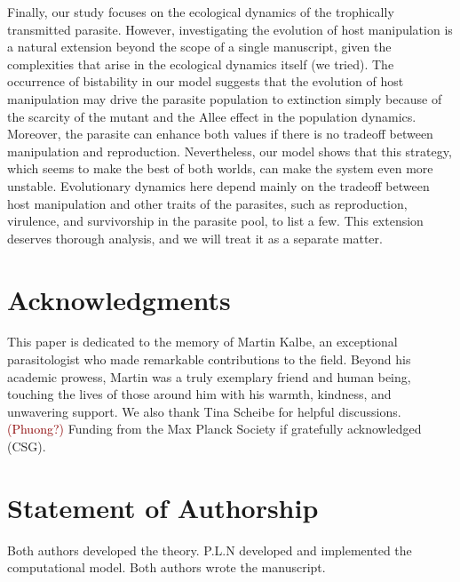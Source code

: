 \documentclass[11pt]{article}
\newcommand{\cha}[1]{\textcolor{darkred}{(#1)}}
\begin{document}
Finally, our study focuses on the ecological dynamics of the trophically transmitted parasite. 
However, investigating the evolution of host manipulation is a natural extension beyond the scope of a single manuscript, given the complexities that arise in the ecological dynamics itself (we tried). 
The occurrence of bistability in our model suggests that the evolution of host manipulation may drive the parasite population to extinction simply because of the scarcity of the mutant and the Allee effect in the population dynamics. 
Moreover, the parasite can enhance both values if there is no tradeoff between manipulation and reproduction. 
Nevertheless, our model shows that this strategy, which seems to make the best of both worlds, can make the system even more unstable. 
Evolutionary dynamics here depend mainly on the tradeoff between host manipulation and other traits of the parasites, such as reproduction, virulence, and survivorship in the parasite pool, to list a few. 
This extension deserves thorough analysis, and we will treat it as a separate matter.




 \section*{Acknowledgments}
This paper is dedicated to the memory of Martin Kalbe, an exceptional parasitologist who made remarkable contributions to the field.
Beyond his academic prowess, Martin was a truly exemplary friend and human being, touching the lives of those around him with his warmth, kindness, and unwavering support. 
We also thank Tina Scheibe for helpful discussions.
\cha{Phuong?}
Funding from the Max Planck Society if gratefully acknowledged (CSG).

 \section*{Statement of Authorship}
Both authors developed the theory.
P.L.N developed and implemented the computational model.
Both authors wrote the manuscript.
 
\end{document}
